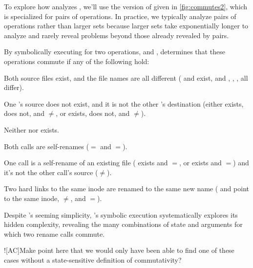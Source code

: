 To explore how \analyzer analyzes , we'll use the version
of  given in \cref{fig:commutes2}, which is specialized
for pairs of operations.  In practice, we typically analyze pairs of
operations rather than larger sets because larger sets take
exponentially longer to analyze and rarely reveal problems beyond
those already revealed by pairs.

By symbolically executing  for two 
operations,  and , \analyzer
determines that these operations commute if any of the following hold:

\begin{CompactItemize}
\item Both source files exist, and the file names are all different
      ( and  exist, and , , ,
       all differ).

\item One 's source does not exist, and it is not the
      other 's destination (either
       exists,  does not, and $\neq$, or
       exists,  does not, and $\neq$).

\item Neither  nor  exists.

\item Both calls are self-renames ($=$ and $=$).

\item One call is a self-rename of an existing file
      ( exists and $=$, or
        exists and $=$) and
      it's not the other call's source ($\neq$).

\item Two hard links to the same inode are renamed to the same new name
      ( and  point to the same inode,
       $\neq$, and $=$).

\end{CompactItemize}

Despite 's seeming simplicity, \analyzer's symbolic
execution systematically explores its hidden complexity, revealing the
many combinations of state and arguments for which two rename calls
commute.

\XXX![AC]{Make point here that we would only have been able to find
  one of these cases without a state-sensitive definition of
  commutativity?}


